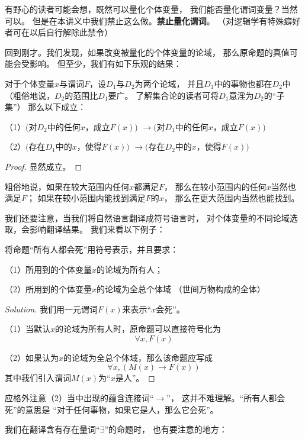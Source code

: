 有野心的读者可能会想，既然可以量化个体变量，
我们能否量化谓词变量？当然可以。
但是在本讲义中我们禁止这么做。\textbf{禁止量化谓词}。
（对逻辑学有特殊癖好者可在以后自行解除此禁令）

回到刚才。我们发现，如果改变被量化的个体变量的论域，
那么原命题的真值可能会受影响。
但至少，我们有如下乐观的结果：

\begin{thm}[论域的收缩与扩张]
对于个体变量$x$与谓词$F$，设$D_1$与$D_2$为两个论域，
并且$D_1$中的事物也都在$D_2$中
（粗俗地说，$D_2$的范围比$D_1$要广。
了解集合论的读者可将$D_1$意淫为$D_2$的“子集”）
那么以下成立：

（1）$($对$D_2$中的任何$x$，成立$F(x))$
$\rightarrow($对$D_1$中的任何$x$，成立$F(x))$

（2）$($存在$D_1$中的$x$，使得$F(x))$
$\rightarrow($存在$D_2$中的$x$，使得$F(x))$
\end{thm}

\begin{proof}
显然成立。
\end{proof}

粗俗地说，如果在较大范围内任何$x$都满足$F$，
那么在较小范围内的任何$x$当然也满足$F$；
如果在较小范围内能找到满足$F$的$x$，
那么在更大范围内当然也能找到。\vs

我们还要注意，当我们将自然语言翻译成符号语言时，
对个体变量的不同论域选取，会影响翻译结果。
我们来看以下例子：

\begin{example}
将命题“所有人都会死”用符号表示，并且要求：

（1）所用到的个体变量$x$的论域为所有人；

（2）所用到的个体变量$x$的论域为全总个体域
（世间万物构成的全体）
\end{example}

\begin{proof}[Solution]
我们用一元谓词$F(x)$来表示“$x$会死”。

（1）当默认$x$的论域为所有人时，原命题可以直接符号化为
$$\forall x,F(x)$$

（2）如果认为$x$的论域为全总个体域，那么该命题应写成
$$\forall x,(M(x)\rightarrow F(x))$$
其中我们引入谓词$M(x)$为“$x$是人”。
\end{proof}

应格外注意（2）当中出现的蕴含连接词“$\rightarrow$”，
这并不难理解。“所有人都会死”的意思是
“对于任何事物，如果它是人，那么它会死”。

我们在翻译含有存在量词“$\exists$”的命题时，
也有要注意的地方：

